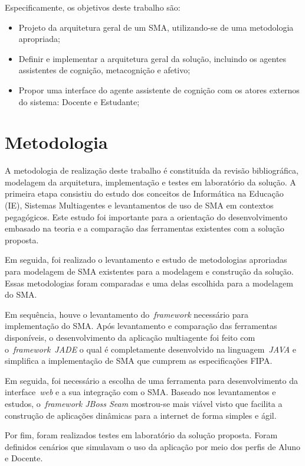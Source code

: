 Especificamente, os objetivos deste trabalho são:
\begin{itemize}
 	\item Projeto da arquitetura geral de um SMA, utilizando-se de uma metodologia apropriada;
	\item Definir e implementar a arquitetura geral da solução, incluindo os agentes assistentes de cognição, metacognição e afetivo;
	\item Propor uma interface do agente assistente de cognição com os atores externos do sistema: Docente e Estudante;
\end{itemize}

\section{Metodologia}

A metodologia de realização deste trabalho é constituída da revisão bibliográfica, modelagem da arquitetura, implementação e testes em laboratório da solução. A primeira etapa consistiu do estudo dos conceitos de Informática na Educação (IE), Sistemas Multiagentes e levantamentos de uso de SMA em contextos pegagógicos. Este estudo foi importante para a orientação do desenvolvimento embasado na teoria e a comparação das ferramentas existentes com a solução proposta.

Em seguida, foi realizado o levantamento e estudo de metodologias aproriadas para modelagem de SMA existentes para a modelagem e construção da solução. Essas metodologias foram comparadas e uma delas escolhida para a modelagem do SMA.

Em sequência, houve o levantamento do~\emph{framework} necessário para implementação do SMA. Após levantamento e comparação das ferramentas disponíveis, o desenvolvimento da aplicação multiagente foi feito com o~\emph{framework}~\emph{JADE} o qual é completamente desenvolvido na linguagem~\emph{JAVA} e simplifica a implementação de SMA que cumprem as especificações FIPA. 

Em seguida, foi necessário a escolha de uma ferramenta para desenvolvimento da interface~\emph{web} e a sua integração com o SMA. Baseado nos levantamentos e estudos, o~\emph{framework JBoss Seam} mostrou-se mais viável visto que facilita a construção de aplicações dinâmicas para a internet de forma simples e ágil.

Por fim, foram realizados testes em laboratório da solução proposta. Foram definidos cenários que simulavam o uso da aplicação por meio dos perfis de Aluno e Docente.

